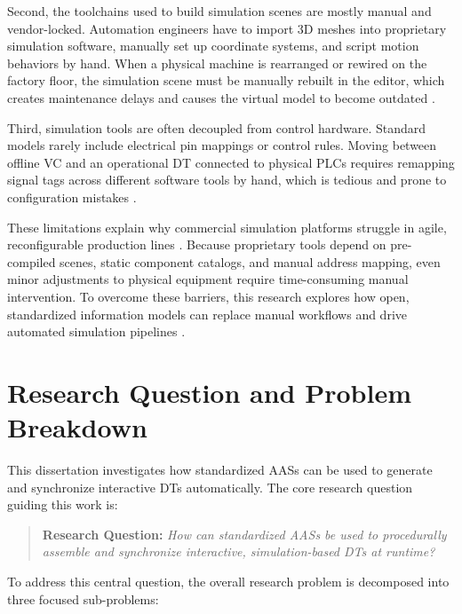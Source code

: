 Second, the toolchains used to build simulation scenes are mostly manual and vendor-locked. Automation engineers have to import 3D meshes into proprietary simulation software, manually set up coordinate systems, and script motion behaviors by hand. When a physical machine is rearranged or rewired on the factory floor, the simulation scene must be manually rebuilt in the editor, which creates maintenance delays and causes the virtual model to become outdated \cite{Alexopoulos2025}.

Third, simulation tools are often decoupled from control hardware. Standard models rarely include electrical pin mappings or control rules. Moving between offline \gls{VC} and an operational \gls{DT} connected to physical \glspl{PLC} requires remapping signal tags across different software tools by hand, which is tedious and prone to configuration mistakes \cite{Striffler2023}.

These limitations explain why commercial simulation platforms struggle in agile, reconfigurable production lines \cite{Rocha2024}. Because proprietary tools depend on pre-compiled scenes, static component catalogs, and manual address mapping, even minor adjustments to physical equipment require time-consuming manual intervention. To overcome these barriers, this research explores how open, standardized information models can replace manual workflows and drive automated simulation pipelines \cite{Luder2020}.

\section{Research Question and Problem Breakdown}
\label{sec:rqs}

This dissertation investigates how standardized \glspl{AAS} can be used to generate and synchronize interactive \glspl{DT} automatically. The core research question guiding this work is:

\begin{quote}
    \textbf{Research Question:} \textit{How can standardized \glspl{AAS} be used to procedurally assemble and synchronize interactive, simulation-based \glspl{DT} at runtime?}
\end{quote}

To address this central question, the overall research problem is decomposed into three focused sub-problems:

